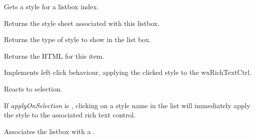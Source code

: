Gets a style for a listbox index.

\label{wxrichtextstylelistboxgetstylesheet}


Returns the style sheet associated with this listbox.

\label{wxrichtextstylelistboxgetstyletype}


Returns the type of style to show in the list box.

\label{wxrichtextstylelistboxongetitem}


Returns the HTML for this item.

\label{wxrichtextstylelistboxonleftdown}


Implements left click behaviour, applying the clicked style to the wxRichTextCtrl.

\label{wxrichtextstylelistboxonselect}


Reacts to selection.

\label{wxrichtextstylelistboxsetapplyonselection}


If {\it applyOnSelection} is \true, clicking on a style name in the list will immediately
apply the style to the associated rich text control.

\label{wxrichtextstylelistboxsetrichtextctrl}


Associates the listbox with a .

\label{wxrichtextstylelistboxsetstylesheet}

